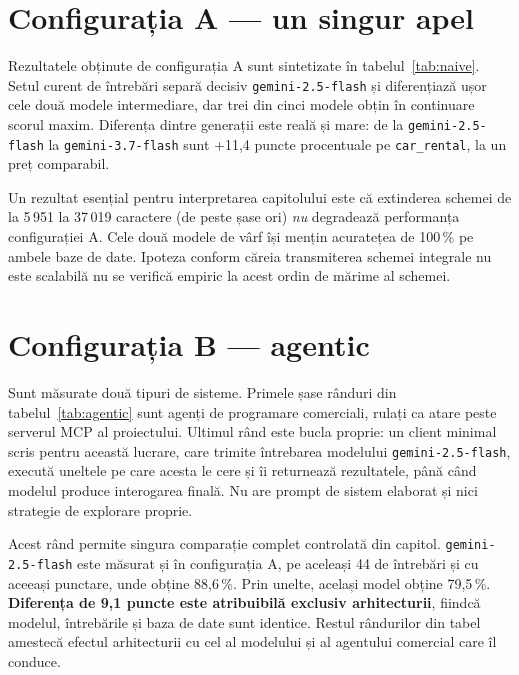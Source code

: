 \documentclass[12pt,a4paper]{report}
\newcommand{\code}[1]{\texttt{\small #1}}
\begin{document}
\section{Configurația A --- un singur apel}
\label{sec:config_a}

\begin{table}[H]
\centering
\caption{Configurația A: schema integrală, un apel. Costul este extrapolat din
consumul de tokeni măsurat, la tarifele verificate la 23.08.2026.}
\label{tab:naive}
\footnotesize

\end{table}

Rezultatele obținute de configurația A sunt sintetizate în tabelul~\ref{tab:naive}.
Setul curent de întrebări separă decisiv \code{gemini-2.5-flash} și diferențiază
ușor cele două modele intermediare, dar trei din cinci modele obțin în continuare
scorul maxim. Diferența dintre generații este reală și mare: de la
\code{gemini-2.5-flash} la \code{gemini-3.7-flash} sunt +11,4 puncte
procentuale pe \code{car\_rental}, la un preț comparabil.

Un rezultat esențial pentru interpretarea capitolului este că extinderea schemei de la 5\,951 la
37\,019 caractere (de peste șase ori) \emph{nu} degradează performanța configurației A.
Cele două modele de vârf își mențin acuratețea de 100\,\% pe ambele baze de date.
Ipoteza conform căreia transmiterea schemei integrale nu este scalabilă nu se verifică
empiric la acest ordin de mărime al schemei.

\section{Configurația B --- agentic}
\label{sec:config_b}

Sunt măsurate două tipuri de sisteme. Primele șase rânduri din
tabelul~\ref{tab:agentic} sunt agenți de programare comerciali, rulați ca
atare peste serverul MCP al proiectului. Ultimul rând este bucla proprie: un
client minimal scris pentru această lucrare, care trimite întrebarea modelului
\code{gemini-2.5-flash}, execută uneltele pe care acesta le cere și îi
returnează rezultatele, până când modelul produce interogarea finală. Nu are
prompt de sistem elaborat și nici strategie de explorare proprie.

Acest rând permite singura comparație complet controlată din capitol.
\code{gemini-2.5-flash} este măsurat și în configurația A, pe aceleași 44 de
întrebări și cu aceeași punctare, unde obține 88,6\,\%. Prin unelte, același
model obține 79,5\,\%. \textbf{Diferența de 9,1 puncte este atribuibilă
exclusiv arhitecturii}, fiindcă modelul, întrebările și baza de date sunt
identice. Restul rândurilor din tabel amestecă efectul arhitecturii cu cel al
modelului și al agentului comercial care îl conduce.
\end{document}
